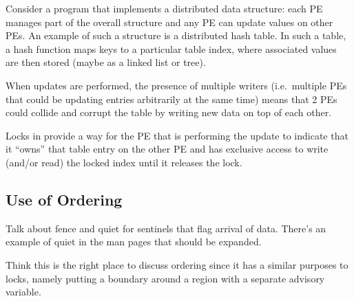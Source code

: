 
Consider a program that implements a distributed data structure: each
PE manages part of the overall structure and any PE can update values
on other PEs.  An example of such a structure is a distributed hash
table.  In such a table, a hash function maps keys to a particular
table index, where associated values are then stored (maybe as a
linked list or tree).

When updates are performed, the presence of multiple writers
(i.e.\ multiple PEs that could be updating entries arbitrarily at the
same time) means that 2 PEs could collide and corrupt the table by
writing new data on top of each other.

Locks in \openshmem provide a way for the PE that is performing the
update to indicate that it ``owns'' that table entry on the other PE
and has exclusive access to write (and/or read) the locked index until
it releases the lock.

\subsection{Use of Ordering}

Talk about fence and quiet for sentinels that flag arrival of data.
There's an example of quiet in the man pages that should be expanded.

Think this is the right place to discuss ordering since it has a
similar purposes to locks, namely putting a boundary around a region
with a separate advisory variable.
